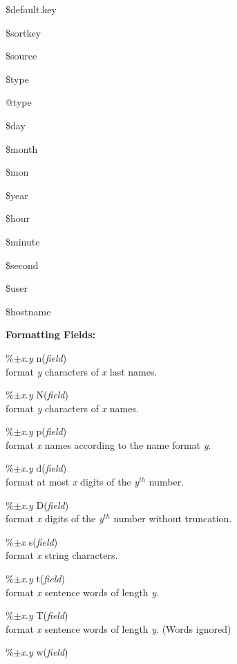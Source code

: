 \documentclass[a4paper]{article}
\newenvironment{FlatList}{\begin{list}{}{%
      \topsep=0pt\itemsep=0pt\parsep=0pt\let\makelabel=\flatlistlabel}}{\end{list}}%
\newcommand\flatlistlabel[1]{\descriptionlabel{\textsf{#1}}}
\begin{document}
\begin{multicols}{4}
\begin{FlatList}
  \item [\$default.key]
  \item [\$sortkey]
  \item [\$source]
  \item [\$type]
  \item [@type]
  \item [\$day]
  \item [\$month]
  \item [\$mon]
  \item [\$year]
  \item [\$hour]
  \item [\$minute]
  \item [\$second]
  \item [\$user]
  \item [\$hostname]
  \end{FlatList}
  \textbf{Formatting Fields:} 
  \begin{FlatList}
  \item [\%$\pm ${\it x}.{\it y}\/ n({\it field}\/)]\ \\
    format {\it y}\/ characters of {\it x}\/ last names.
  \item [\%$\pm ${\it x}.{\it y}\/ N({\it field}\/)]\ \\
    format {\it y}\/ characters of {\it x}\/ names.
  \item [\%$\pm ${\it x}.{\it y}\/ p({\it field}\/)]\ \\
    format {\it x}\/ names according to the name format {\it y}.
  \item [\%$\pm ${\it x}.{\it y}\/ d({\it field}\/)]\ \\
    format at most {\it x}\/ digits of the {\it y}$^{th}$ number.
  \item [\%$\pm ${\it x}.{\it y}\/ D({\it field}\/)]\ \\
    format {\it x}\/ digits of the {\it y}$^{th}$ number without truncation.
  \item [\%$\pm ${\it x}\/ s({\it field}\/)]\ \\
    format {\it x}\/ string characters.
  \item [\%$\pm ${\it x}.{\it y}\/ t({\it field}\/)]\ \\
    format {\it x}\/ sentence words of length {\it y}.
  \item [\%$\pm ${\it x}.{\it y}\/ T({\it field}\/)]\ \\
    format {\it x}\/ sentence words  of length {\it y}. (Words ignored)
  \item [\%$\pm ${\it x}.{\it y}\/ w({\it field}\/)]\ \\

\end{FlatList}
\end{multicols}
\end{document}

